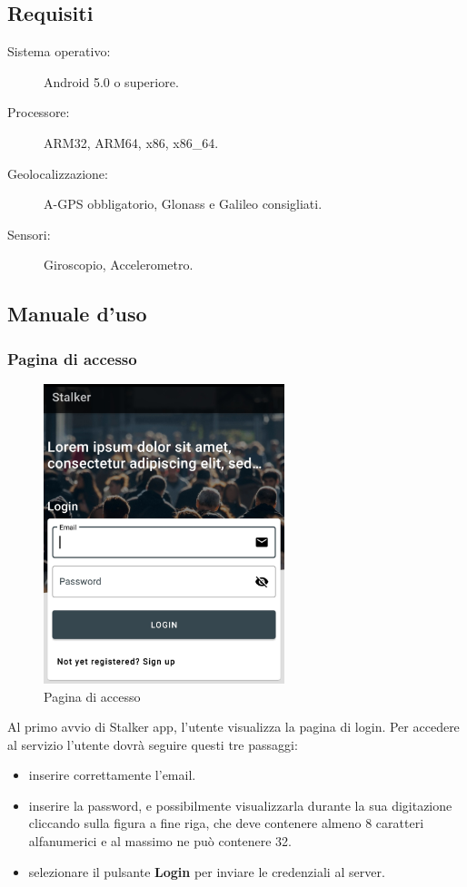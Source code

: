 \documentclass[../manuale-utente.tex]{subfiles}
\begin{document}
\subsection{Requisiti}%
\label{sub:requisiti}

\begin{description}
    \item[Sistema operativo:] Android 5.0 o superiore.
    \item[Processore:] ARM32, ARM64, x86, x86\_64.
    \item[Geolocalizzazione:] A-GPS obbligatorio, Glonass e Galileo consigliati.
    \item[Sensori:] Giroscopio, Accelerometro.
\end{description}
\newpage

\subsection{Manuale d'uso}%
\label{sub:manuale_uso_mobile}

\subsubsection{Pagina di accesso}%
\label{sub:pagina_di_accesso}

\begin{figure}[H]
    \centering
    \includegraphics[width=70mm]{img/mobile-app/pagina-di-accesso.jpg}
    \caption{Pagina di accesso}%
    \label{fig:mobile_app_pagina_di_accesso}
\end{figure}

Al primo avvio di Stalker app, l'utente visualizza la pagina di login. 
Per accedere al servizio l'utente dovrà seguire questi tre passaggi:
\begin{itemize}
    \item inserire correttamente l'email.
    \item inserire la password, e possibilmente visualizzarla durante la sua digitazione cliccando sulla figura a fine riga, che deve contenere almeno 8 caratteri alfanumerici e al massimo ne può contenere 32.
    \item selezionare il pulsante \textbf{Login} per inviare le credenziali al server.
\end{itemize} 
\end{document}

